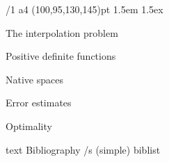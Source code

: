 \useOpTeX  %



\hyperlinks \Black \Black
{}

\enlang
\fontfam[EBGaramond]

\margins/1 a4 (100,95,130,145)pt
\typosize[12.21/14.5]
\parindent 1.5em
\parskip 1.5ex

\tocpage


\sec The interpolation problem


\sec Positive definite functions


\sec Native spaces


\sec Error estimates


\sec Optimality










\let\_mtext\ignoreit
\nonum\chap Bibliography
\def\_opwarning#1{}
\usebib/s (simple) biblist


\bye